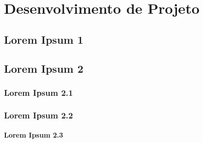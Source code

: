 \chapter{Desenvolvimento de Projeto}

\section{Lorem Ipsum 1}

\lipsum[1-4]

\section{Lorem Ipsum 2}

\lipsum[1-4]

\subsection{Lorem Ipsum 2.1}

\lipsum[1-4]

\subsection{Lorem Ipsum 2.2}

\lipsum[1-4]

\subsubsection{Lorem Ipsum 2.3}

\lipsum[1-4]